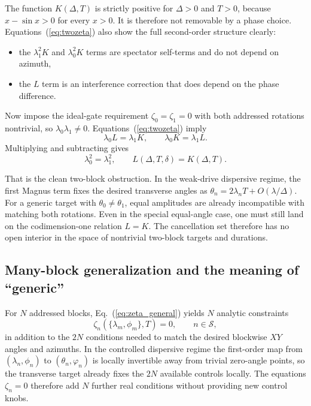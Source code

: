 \documentclass[aps,pra,twocolumn,reprint,floatfix,amsmath,amssymb]{revtex4-2}
\begin{document}
The function \(K(\Delta,T)\) is strictly positive for \(\Delta>0\) and \(T>0\), because \(x-\sin x>0\) for every \(x>0\). It is therefore not removable by a phase choice. Equations~(\ref{eq:twozeta}) also show the full second-order structure clearly:
\begin{itemize}
  \item the \(\lambda_1^2 K\) and \(\lambda_0^2 K\) terms are spectator self-terms and do not depend on azimuth,
  \item the \(L\) term is an interference correction that does depend on the phase difference.
\end{itemize}

Now impose the ideal-gate requirement \(\zeta_0=\zeta_1=0\) with both addressed rotations nontrivial, so \(\lambda_0\lambda_1 \neq 0\). Equations~(\ref{eq:twozeta}) imply
\begin{equation}
\lambda_0 L = \lambda_1 K,
\qquad
\lambda_0 K = \lambda_1 L.
\end{equation}
Multiplying and subtracting gives
\begin{equation}
\lambda_0^2=\lambda_1^2,
\qquad
L(\Delta,T,\delta)=K(\Delta,T).
\label{eq:twoconditions}
\end{equation}

That is the clean two-block obstruction. In the weak-drive dispersive regime, the first Magnus term fixes the desired transverse angles as \(\theta_n = 2\lambda_n T + O(\lambda/\Delta)\). For a generic target with \(\theta_0 \neq \theta_1\), equal amplitudes are already incompatible with matching both rotations. Even in the special equal-angle case, one must still land on the codimension-one relation \(L=K\). The cancellation set therefore has no open interior in the space of nontrivial two-block targets and durations.

\subsection{Many-block generalization and the meaning of ``generic''}

For \(N\) addressed blocks, Eq.~(\ref{eq:zeta_general}) yields \(N\) analytic constraints
\begin{equation}
\zeta_n(\{\lambda_m,\phi_m\},T)=0,
\qquad n \in \mathcal{S},
\label{eq:manyzeta}
\end{equation}
in addition to the \(2N\) conditions needed to match the desired blockwise \(XY\) angles and azimuths. In the controlled dispersive regime the first-order map from \((\lambda_n,\phi_n)\) to \((\theta_n,\varphi_n)\) is locally invertible away from trivial zero-angle points, so the transverse target already fixes the \(2N\) available controls locally. The equations \(\zeta_n=0\) therefore add \(N\) further real conditions without providing new control knobs.
\end{document}
